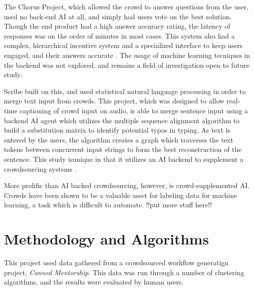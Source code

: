 The Chorus Project, which allowed the crowd to answer questions from the user, used no back-end AI at all, and simply had users vote on the best solution.
Though the end product had a high answer accuracy rating, the latency of responses was on the order of minutes in most cases.
This system also had a complex, hierarchical incentive system and a specialized interface to keep users engaged, and their answers accurate \cite{lasecki2013chorus}.
The usage of machine learning tecniques in the backend was not explored, and remains a field of investigation open to future study.

Scribe built on this, and used statistical natural language processing in order to merge text input from crowds. 
This project, which was designed to allow real-time captioning of crowd input on audio, is able to merge sentence input using a backend AI agent which utilizes the multiple sequence alignment algorithm to build a substitution matrix to identify potential typos in typing.
As text is entered by the users, the algorithm creates a graph which traverses the text tokens between concurrent input strings to form the best reconstruction of the sentence. 
This study isunique in that it utilizes an AI backend to supplement a crowdsourcing systems \cite{naim2013text}.

More prolific than AI backed crowdsourcing, however, is crowd-supplemented AI. Crowds have been shown to be a valuable asset for labeling data for machine learning, a task which is difficult to automate\cite{ml-sup-from-crowds}. !!put more stuff here!!

\section{Methodology and Algorithms}
This project used data gathered from a crowdsourced workflow generatign project, \emph{Canned Mentorship}. 
This data was run through a number of clustering algorithms, and the results were evaluated by human users.




